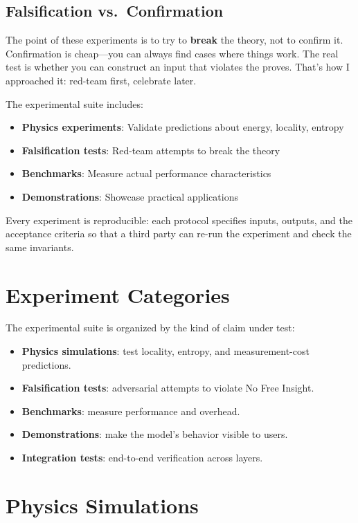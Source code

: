 \subsection{Falsification vs.\ Confirmation}

The point of these experiments is to try to \textbf{break} the theory, not to confirm it. Confirmation is cheap---you can always find cases where things work. The real test is whether you can construct an input that violates the proves. That's how I approached it: red-team first, celebrate later.

The experimental suite includes:
\begin{itemize}
    \item \textbf{Physics experiments}: Validate predictions about energy, locality, entropy
    \item \textbf{Falsification tests}: Red-team attempts to break the theory
    \item \textbf{Benchmarks}: Measure actual performance characteristics
    \item \textbf{Demonstrations}: Showcase practical applications
\end{itemize}

Every experiment is reproducible: each protocol specifies inputs, outputs, and the acceptance criteria so that a third party can re-run the experiment and check the same invariants.

\section{Experiment Categories}

The experimental suite is organized by the kind of claim under test:
\begin{itemize}
    \item \textbf{Physics simulations}: test locality, entropy, and measurement-cost predictions.
    \item \textbf{Falsification tests}: adversarial attempts to violate No Free Insight.
    \item \textbf{Benchmarks}: measure performance and overhead.
    \item \textbf{Demonstrations}: make the model’s behavior visible to users.
    \item \textbf{Integration tests}: end-to-end verification across layers.
\end{itemize}

\section{Physics Simulations}

